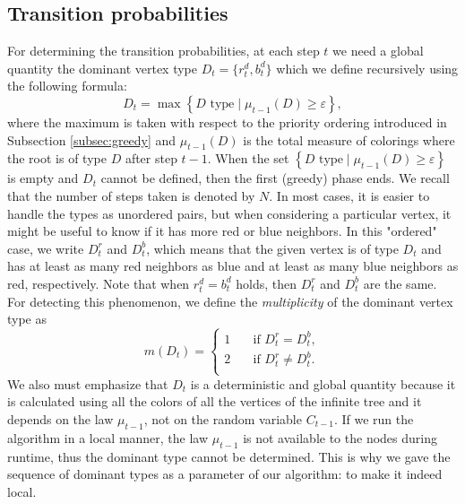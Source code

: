 \documentclass{article}
\theoremstyle{definition}
\newcommand{\eps}{\varepsilon}
\begin{document}
\subsection{Transition probabilities}\label{transition}
For determining the transition probabilities, at each step $t$ we need a global quantity the dominant vertex type $D_t=\{r_t^d,b_t^d\}$ which we define recursively using the following formula:
$$D_t=\max\left\{D\text{ type}\mid \mu_{t-1}(D)\geq\eps\right\},$$ where the maximum is taken with respect to the priority ordering introduced in Subsection \ref{subsec:greedy} and $\mu_{t-1}(D)$ is the total measure of colorings where the root is of type $D$ after step $t-1.$
When the set $\left\{D\text{ type}\mid \mu_{t-1}(D)\geq\eps\right\}$ is empty and $D_t$ cannot be defined, then the first (greedy) phase ends. We recall that the number of steps taken is denoted by $N$.
In most cases, it is easier to handle the types as unordered pairs, but when considering a particular vertex, it might be useful to know if it has more red or blue neighbors. In this "ordered" case, we write $D_t^r$ and $D_t^b$, which means that the given vertex is of type $D_t$ and has at least as many red neighbors as blue and at least as many blue neighbors as red, respectively. Note that when $r_t^d=b_t^d$ holds, then $D_t^r$ and $D_t^b$ are the same. For detecting this phenomenon, we define the \emph{multiplicity} of the dominant vertex type as
$$m(D_t)=\begin{cases}1
&\quad\text{if } D_t^r=D_t^b,\\
    2&\quad\text{if } D_t^r\neq D_t^b.\\
\end{cases}$$
We also must emphasize that $D_t$ is a deterministic and global quantity because it is calculated using all the colors of all the vertices of the infinite tree and it depends on the law $\mu_{t-1}$, not on the random variable $C_{t-1}$. If we run the algorithm in a local manner, the law $\mu_{t-1}$ is not available to the nodes during runtime, thus the dominant type cannot be determined. This is why we gave the sequence of dominant types as a parameter of our algorithm: to make it indeed local.
\end{document}
